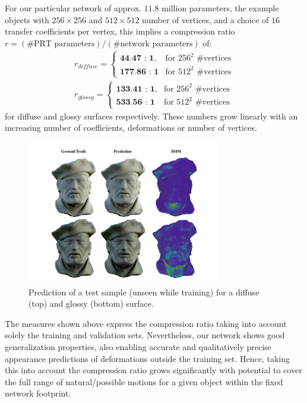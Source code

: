 For our particular network of approx. $11.8$ million parameters,  the example objects with $256 \times 256$ and $512 \times 512$ number of vertices, and a choice of $16$ transfer coefficients per vertex, this implies a compression ratio $r = (\text{\# PRT parameters})/(\text{\# network parameters})$ of: 
\begin{align*}
r_{diffuse} = 
\begin{cases}
\textbf{44.47 : 1} , & \mbox{for } 256^2 \mbox{ \#vertices} \\
\textbf{177.86 : 1} & \mbox{for } 512^2 \mbox{ \#vertices}
\end{cases}
\\
r_{glossy} = 
\begin{cases}
\textbf{133.41 : 1} , & \mbox{for } 256^2 \mbox{ \#vertices} \\
\textbf{533.56 : 1} & \mbox{for } 512^2 \mbox{ \#vertices}
\end{cases}
\end{align*}
for diffuse and glossy surfaces respectively. These numbers grow linearly with an increasing number of coefficients, deformations or number of vertices. 
\begin{figure}[H]
  \centering
    \includegraphics[width=0.75\textwidth]{Figures/glossy_pirate.pdf}
     \caption{Prediction of a test sample (unseen while training) for a diffuse (top) and glossy (bottom) surface. }
     \label{Fig: glossy_pirate}
\end{figure}
The measures shown above express the compression ratio taking into account solely the training and validation sets. Nevertheless, our network shows good generalization properties, also enabling accurate and qualitatively precise appearance predictions of deformations outside the training set. Hence, taking this into account the compression ratio grows significantly with potential to cover the full range of natural/possible motions for a given object within the fixed network footprint.

